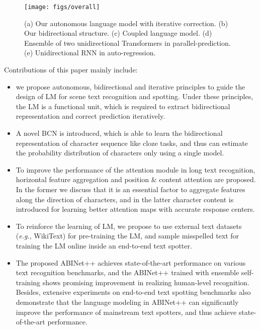 \documentclass[10pt,journal,compsoc]{IEEEtran}
\def\eg{{\it e.g.}\xspace}
\begin{document}
\begin{figure}
   \begin{center}
      \texttt{[image: figs/overall]}
      \caption{(a) Our autonomous language model with iterative correction. (b) Our bidirectional structure. (c) Coupled language model. (d) Ensemble of two unidirectional Transformers in parallel-prediction. (e) Unidirectional RNN in auto-regression. }
      \label{fig:overall}
   \end{center}
   \vspace{-2em}
\end{figure}

Contributions of this paper mainly include: 
\begin{itemize}
\item
we propose autonomous, bidirectional and iterative principles to guide the design of LM for scene text recognition and spotting. Under these principles, the LM is a functional unit, which is required to extract bidirectional representation and correct prediction iteratively. 

\item
A novel BCN is introduced, which is able to learn the bidirectional representation of character sequence like cloze tasks, and thus can estimate the probability distribution of characters only using a single model. 

\item 
To improve the performance of the attention module in long text recognition, horizontal feature aggregation and position \& content attention are proposed. In the former we discuss that it is an essential factor to aggregate features along the direction of characters, and in the latter character content is introduced for learning better attention maps with accurate response centers.

\item 
To reinforce the learning of LM, we propose to use external text datasets (\eg, WikiText) for pre-training the LM, and sample misspelled text for training the LM online inside an end-to-end text spotter.

\item
The proposed ABINet++ achieves state-of-the-art performance on various text recognition benchmarks, and the ABINet++ trained with ensemble self-training shows promising improvement in realizing human-level recognition. Besides, extensive experiments on end-to-end text spotting benchmarks also demonstrate that the language modeling in ABINet++ can significantly improve the performance of mainstream text spotters, and thus achieve state-of-the-art performance.
\end{itemize}
\end{document}
